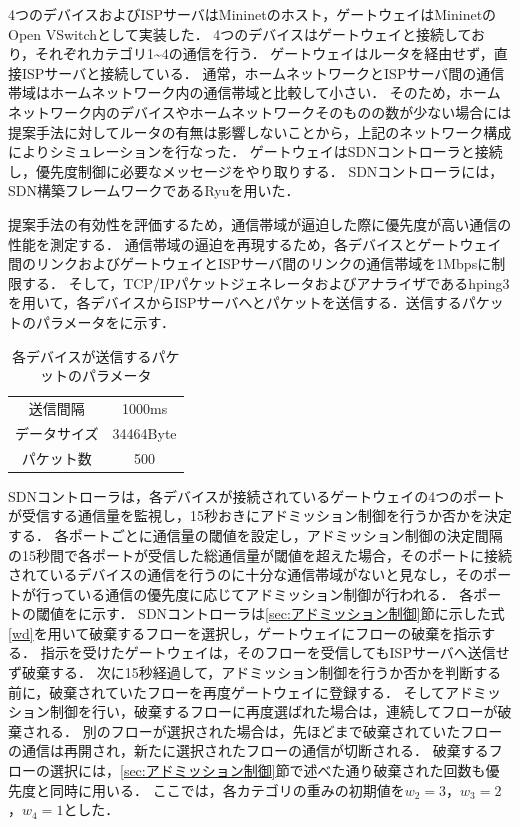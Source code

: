 \documentclass[a4paper,11pt,uplatex]{ujreport}
\begin{document}
  4つのデバイスおよびISPサーバはMininetのホスト，ゲートウェイはMininetのOpen VSwitchとして実装した．
  4つのデバイスはゲートウェイと接続しており，それぞれカテゴリ1\textasciitilde4の通信を行う．
  ゲートウェイはルータを経由せず，直接ISPサーバと接続している．
  通常，ホームネットワークとISPサーバ間の通信帯域はホームネットワーク内の通信帯域と比較して小さい．
  そのため，ホームネットワーク内のデバイスやホームネットワークそのものの数が少ない場合には提案手法に対してルータの有無は影響しないことから，上記のネットワーク構成によりシミュレーションを行なった．
  ゲートウェイはSDNコントローラと接続し，優先度制御に必要なメッセージをやり取りする．
  SDNコントローラには，SDN構築フレームワークであるRyuを用いた．\par

  提案手法の有効性を評価するため，通信帯域が逼迫した際に優先度が高い通信の性能を測定する．
  通信帯域の逼迫を再現するため，各デバイスとゲートウェイ間のリンクおよびゲートウェイとISPサーバ間のリンクの通信帯域を1Mbpsに制限する．
  そして，TCP/IPパケットジェネレータおよびアナライザであるhping3を用いて，各デバイスからISPサーバへとパケットを送信する．送信するパケットのパラメータをに示す．

  \begin{table}[tb]
    \caption{各デバイスが送信するパケットのパラメータ}
    \label{tab:packetParameter}
    \centering
    \begin{tabular}{cc}
      \hline
      送信間隔 & 1000ms\\
      データサイズ & 34464Byte\\
      パケット数 & 500\\
      \hline
    \end{tabular}
  \end{table}

  SDNコントローラは，各デバイスが接続されているゲートウェイの4つのポートが受信する通信量を監視し，15秒おきにアドミッション制御を行うか否かを決定する．
  各ポートごとに通信量の閾値を設定し，アドミッション制御の決定間隔の15秒間で各ポートが受信した総通信量が閾値を超えた場合，そのポートに接続されているデバイスの通信を行うのに十分な通信帯域がないと見なし，そのポートが行っている通信の優先度に応じてアドミッション制御が行われる．
  各ポートの閾値をに示す．
  SDNコントローラは\ref{sec:アドミッション制御}節に示した式\ref{wd}を用いて破棄するフローを選択し，ゲートウェイにフローの破棄を指示する．
  指示を受けたゲートウェイは，そのフローを受信してもISPサーバへ送信せず破棄する．
  次に15秒経過して，アドミッション制御を行うか否かを判断する前に，破棄されていたフローを再度ゲートウェイに登録する．
  そしてアドミッション制御を行い，破棄するフローに再度選ばれた場合は，連続してフローが破棄される．
  別のフローが選択された場合は，先ほどまで破棄されていたフローの通信は再開され，新たに選択されたフローの通信が切断される．
  破棄するフローの選択には，\ref{sec:アドミッション制御}節で述べた通り破棄された回数も優先度と同時に用いる．
  ここでは，各カテゴリの重みの初期値を$w_2=3$，$w_3=2$，$w_4=1$とした．\par
\end{document}
